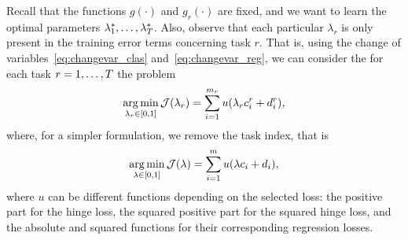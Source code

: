 Recall that the functions $g(\cdot)$ and $g_r(\cdot)$ are fixed, and we want to learn the optimal parameters $\lambda_1^*, \ldots, \lambda_T^*$. Also, observe that each particular $\lambda_r$ is only present in the training error terms concerning task $r$. That is, using the change of variables~\eqref{eq:changevar_clas} and~\eqref{eq:changevar_reg}, we can consider the for each task $r=1, \ldots, T$ the problem
\begin{equation}
    \nonumber
    \operatorname*{arg\min}_{\lambda_r \in [0, 1]} \mathcal{J}(\lambda_r) = \sum_{i=1}^{m_r} u(\lambda_r c_i^r + d_i^r),
\end{equation}
where, for a simpler formulation, we remove the task index, that is 
\begin{equation}
    \label{eq:subproblem_lambda}
    \argmin_{\lambda \in [0, 1]} \mathcal{J}(\lambda) = \sum_{i=1}^{\npertask} u(\lambda c_i + d_i),
\end{equation}
where $u$ can be different functions depending on the selected loss: the positive part for the hinge loss, the squared positive part for the squared hinge loss, and the absolute and squared functions for their corresponding regression losses.

